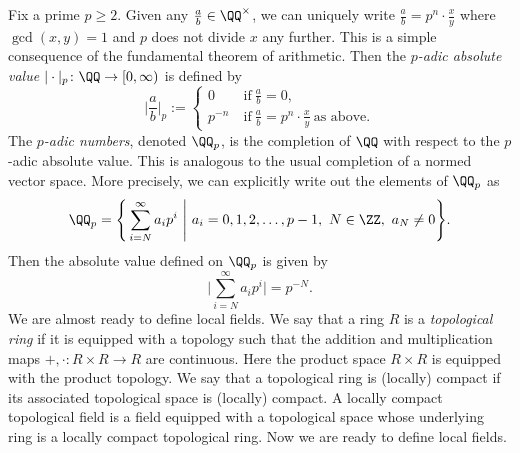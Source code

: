 \documentclass[11pt]{amsart}
\theoremstyle{remark}
\begin{document}
Fix a prime $p\geq 2$.
Given any $\frac{a}{b}\in\QQ^\times$, we can uniquely write $\frac{a}{b} = p^n\cdot\frac{x}{y}$ where $\gcd(x,y)=1$ and $p$ does not divide $x$ any further.
This is a simple consequence of the fundamental theorem of arithmetic.
Then the \emph{$p$-adic absolute value} $|\cdot|_p\colon \QQ\to[0,\infty)$ is defined by
\[
	\bigg|\frac{a}{b}\bigg|_p := \begin{cases}
		0\       & \text{if}\ \frac{a}{b}=0,                                      \\
		p^{-n}\  & \text{if}\ \frac{a}{b} = p^n\cdot\frac{x}{y}\ \text{as above}.
	\end{cases}
\]
The \emph{$p$-adic numbers}, denoted $\QQ_p$, is the completion of $\QQ$ with respect to the $p$-adic absolute value.
This is analogous to the usual completion of a normed vector space.
More precisely, we can explicitly write out the elements of $\QQ_p$ as
\[
	\QQ_p = \Bigg\{\sum_{i=N}^\infty a_ip^i\ \Bigg|\ a_i=0,1,2,\ldots,p-1,\ N\in\ZZ,\ a_N\neq0 \Bigg\}.
\]
Then the absolute value defined on $\QQ_p$ is given by
\[
	\Bigg|\sum_{i=N}^\infty a_ip^i\Bigg| = p^{-N}.
\]
We are almost ready to define local fields.
We say that a ring $R$ is a \emph{topological ring} if it is equipped with a topology  such that the addition and multiplication maps $+,\cdot\colon R\times R\to R$ are continuous.
Here the product space $R\times R$ is equipped with the product topology.
We say that a topological ring is (locally) compact if its associated topological space is (locally) compact.
A locally compact topological field is a field equipped with a topological space whose underlying ring is a locally compact topological ring.
Now we are ready to define local fields.
\end{document}
